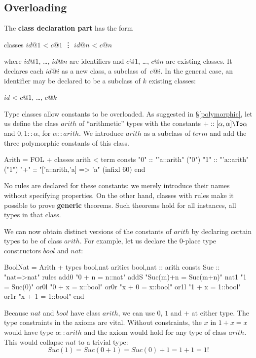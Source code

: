 \subsection{Overloading}
The {\bf class declaration part} has the form
\begin{ttbox}
classes \(id@1\) < \(c@1\)
        \vdots
        \(id@n\) < \(c@n\)
\end{ttbox}
where $id@1$, \ldots, $id@n$ are identifiers and $c@1$, \ldots, $c@n$ are
existing classes.  It declares each $id@i$ as a new class, a subclass
of~$c@i$.  In the general case, an identifier may be declared to be a
subclass of $k$ existing classes:
\begin{ttbox}
        \(id\) < \(c@1\), \ldots, \(c@k\)
\end{ttbox}
Type classes allow constants to be overloaded.  As suggested in
\S\ref{polymorphic}, let us define the class $arith$ of ``arithmetic''
types with the constants ${+} :: [\alpha,\alpha]\To \alpha$ and $0,1 {::}
\alpha$, for $\alpha{::}arith$.  We introduce $arith$ as a subclass of
$term$ and add the three polymorphic constants of this class.
\begin{ttbox}
Arith = FOL +
classes arith < term
consts  "0"     :: "'a::arith"                  ("0")
        "1"     :: "'a::arith"                  ("1")
        "+"     :: "['a::arith,'a] => 'a"       (infixl 60)
end
\end{ttbox}
No rules are declared for these constants: we merely introduce their
names without specifying properties.  On the other hand, classes
with rules make it possible to prove {\bf generic} theorems.  Such
theorems hold for all instances, all types in that class.

We can now obtain distinct versions of the constants of $arith$ by
declaring certain types to be of class $arith$.  For example, let us
declare the 0-place type constructors $bool$ and $nat$:
\begin{ttbox}
BoolNat = Arith +
types   bool,nat
arities bool,nat    :: arith
consts  Suc         :: "nat=>nat"
\ttbreak
rules   add0        "0 + n = n::nat"
        addS        "Suc(m)+n = Suc(m+n)"
        nat1        "1 = Suc(0)"
        or0l        "0 + x = x::bool"
        or0r        "x + 0 = x::bool"
        or1l        "1 + x = 1::bool"
        or1r        "x + 1 = 1::bool"
end
\end{ttbox}
Because $nat$ and $bool$ have class $arith$, we can use $0$, $1$ and $+$ at
either type.  The type constraints in the axioms are vital.  Without
constraints, the $x$ in $1+x = x$ would have type $\alpha{::}arith$
and the axiom would hold for any type of class $arith$.  This would
collapse $nat$ to a trivial type:
\[ Suc(1) = Suc(0+1) = Suc(0)+1 = 1+1 = 1! \]


